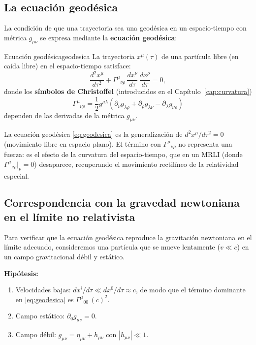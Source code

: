 \subsection{La ecuación geodésica}

La condición de que una trayectoria sea una geodésica en un espacio-tiempo con métrica $g_{\mu\nu}$ se expresa mediante la \textbf{ecuación geodésica}:

\begin{teorema}{Ecuación geodésica}{geodesica}
La trayectoria $x^\mu(\tau)$ de una partícula libre (en caída libre) en el espacio-tiempo satisface:
\begin{equation}
  \frac{d^2x^\mu}{d\tau^2} + \Gamma^\mu{}_{\nu\rho}\,\frac{dx^\nu}{d\tau}\,\frac{dx^\rho}{d\tau} = 0,
  \label{eq:geodesica}
\end{equation}
donde los \textbf{símbolos de Christoffel} (introducidos en el Capítulo~\ref{cap:curvatura})
\begin{equation}
  \Gamma^\mu{}_{\nu\rho} = \frac{1}{2}g^{\mu\lambda}
  \left(\partial_\nu g_{\lambda\rho} + \partial_\rho g_{\lambda\nu} - \partial_\lambda g_{\nu\rho}\right)
  \label{eq:christoffel_cap5}
\end{equation}
dependen de las derivadas de la métrica $g_{\mu\nu}$.
\end{teorema}

\begin{importante}
La ecuación geodésica \eqref{eq:geodesica} es la generalización de $d^2x^\mu/d\tau^2 = 0$ (movimiento libre en espacio plano). El término con $\Gamma^\mu{}_{\nu\rho}$ no representa una fuerza: es el efecto de la curvatura del espacio-tiempo, que en un MRLI (donde $\Gamma^\mu{}_{\nu\rho}|_p = 0$) desaparece, recuperando el movimiento rectilíneo de la relatividad especial.
\end{importante}

\subsection{Correspondencia con la gravedad newtoniana en el límite no relativista}

Para verificar que la ecuación geodésica reproduce la gravitación newtoniana en el límite adecuado, consideremos una partícula que se mueve lentamente ($v \ll c$) en un campo gravitacional débil y estático.

\textbf{Hipótesis:}
\begin{enumerate}[leftmargin=2em]
  \item Velocidades bajas: $dx^i/d\tau \ll dx^0/d\tau \approx c$, de modo que el término dominante en \eqref{eq:geodesica} es $\Gamma^\mu{}_{00}\,(c)^2$.
  \item Campo estático: $\partial_0 g_{\mu\nu} = 0$.
  \item Campo débil: $g_{\mu\nu} = \eta_{\mu\nu} + h_{\mu\nu}$ con $|h_{\mu\nu}| \ll 1$.
\end{enumerate}

